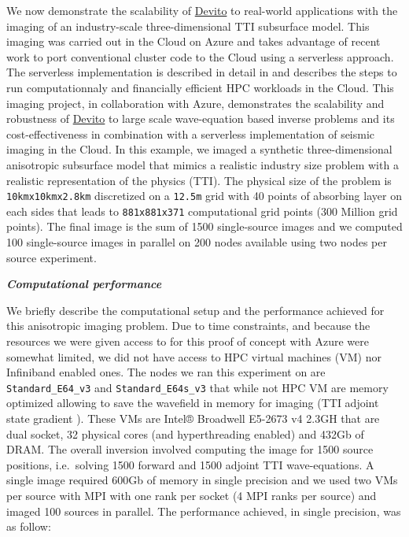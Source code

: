 \documentclass[conference]{IEEEtran}
\begin{document}
We now demonstrate the scalability of
\href{https://github.com/devitocodes/devito}{Devito} to real-world
applications with the imaging of an industry-scale three-dimensional TTI
subsurface model. This imaging was carried out in the Cloud on Azure and
takes advantage of recent work to port conventional cluster code to the
Cloud using a serverless approach. The serverless implementation is
described in detail in \cite{witte2019TPDedas, witte2019SEGedw} and
describes the steps to run computationnaly and financially efficient HPC
workloads in the Cloud. This imaging project, in collaboration with
Azure, demonstrates the scalability and robustness of
\href{https://github.com/devitocodes/devito}{Devito} to large scale
wave-equation based inverse problems and its cost-effectiveness in
combination with a serverless implementation of seismic imaging in the
Cloud. In this example, we imaged a synthetic three-dimensional
anisotropic subsurface model that mimics a realistic industry size
problem with a realistic representation of the physics (TTI). The
physical size of the problem is \texttt{10kmx10kmx2.8km} discretized on
a \texttt{12.5m} grid with 40 points of absorbing layer on each sides
that leads to \texttt{881x881x371} computational grid points (300
Million grid points). The final image is the sum of 1500 single-source
images and we computed 100 single-source images in parallel on 200 nodes
available using two nodes per source experiment.

\textbf{\emph{Computational performance}}

We briefly describe the computational setup and the performance achieved
for this anisotropic imaging problem. Due to time constraints, and
because the resources we were given access to for this proof of concept
with Azure were somewhat limited, we did not have access to HPC virtual
machines (VM) nor Infiniband enabled ones. The nodes we ran this
experiment on are \texttt{Standard\_E64\_v3} and
\texttt{Standard\_E64s\_v3} that while not HPC VM are memory optimized
allowing to save the wavefield in memory for imaging (TTI adjoint state
gradient \cite{virieux, louboutin2018segeow}). These VMs are Intel®
Broadwell E5-2673 v4 2.3GH that are dual socket, 32 physical cores (and
hyperthreading enabled) and 432Gb of DRAM. The overall inversion
involved computing the image for 1500 source positions, i.e.~solving
1500 forward and 1500 adjoint TTI wave-equations. A single image
required 600Gb of memory in single precision and we used two VMs per
source with MPI with one rank per socket (4 MPI ranks per source) and
imaged 100 sources in parallel. The performance achieved, in single
precision, was as follow:
\end{document}
